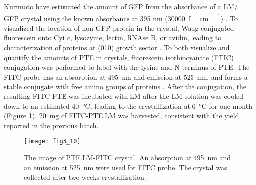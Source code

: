 \begin{refsection}
Kurimoto  have estimated the amount of GFP from the absorbance of
a LM/ GFP crystal using the known absorbance at 395 nm
(\SI{30000}{\liter\per\Molar\per\cm}) \cite{Kurimoto1999}. To visualized the
location of non-GFP protein in the crystal, Wang  conjugated
fluorescein onto Cyt c, lysozyme, lectin, RNAse B, or avidin, leading to
characterization of proteins at (010) growth sector \cite{Wang2001a}. To both
visualize and quantify the amounts of PTE in crystals, fluorescein
isothiocyanate (FTIC) conjugation was performed to label with the lysine and
N-terminus of PTE. The FITC probe has an absorption at \SI{495}{\nm} and
emission at \SI{525}{\nm}, and forms a stable conjugate with free amino groups
of proteins \cite{Rogers1999}. After the conjugation, the resulting FITC-PTE
was incubated with LM after the LM solution was cooled down to an estimated
\SI{40}{\celsius}, leading to the crystallization at \SI{6}{\celsius} for one
month (Figure \ref{fig:ptelm-fitc}). \SI{20}{\mg} of FITC-PTE.LM was harvested,
consistent with the yield reported in the previous batch.
\begin{figure}[htbp] \centering \texttt{[image: fig3\_10]} 
    \caption[The image of PTE.LM-FITC crystal. An absorption at \SI{495}{\nm}
    and an emission at \SI{525}{\nm} were used for FITC probe. The crystal was
collected after two weeks crystallization.]{The image of PTE.LM-FITC crystal.
    An absorption at \SI{495}{\nm} and an emission at \SI{525}{\nm} were used
for FITC probe. The crystal was collected after two weeks crystallization.}
\label{fig:ptelm-fitc} 
\end{figure}


\end{refsection}
